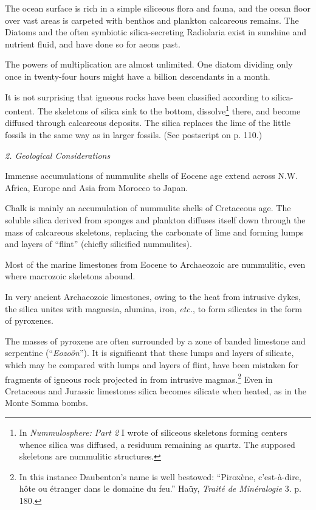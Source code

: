 \documentclass[a4paper, 12pt, oneside]{article}
\begin{document}
The ocean surface is rich in a simple siliceous flora and fauna, and the ocean floor over vast areas is carpeted with benthos and plankton calcareous remains. The Diatoms and the often symbiotic silica-secreting Radiolaria exist in sunshine and nutrient fluid, and have done so for aeons past.

The powers of multiplication are almost unlimited. One diatom dividing only once in twenty-four hours might have a billion descendants in a month.

It is not surprising that igneous rocks have been classified according to silica-content. The skeletons of silica sink to the bottom, dissolve\footnote{In \emph{Nummulosphere: Part 2} I wrote of siliceous skeletons forming centers whence silica was diffused, a residuum remaining as quartz. The supposed skeletons are nummulitic structures.} there, and become diffused through calcareous deposits. The silica replaces the lime of the little fossils in the same way as in larger fossils. (See postscript on p. 110.)

\bigskip
\centerline{\emph{2. Geological Considerations}}

Immense accumulations of nummulite shells of Eocene age extend across N.W. Africa, Europe and Asia from Morocco to Japan.

Chalk is mainly an accumulation of nummulite shells of Cretaceous age. The soluble silica derived from sponges and plankton diffuses itself down through the mass of calcareous skeletons, replacing the carbonate of lime and forming lumps and layers of ``flint'' (chiefly silicified nummulites).

Most of the marine limestones from Eocene to Archaeozoic are nummulitic, even where macrozoic skeletons abound.

In very ancient Archaeozoic limestones, owing to the heat from intrusive dykes, the silica unites with magnesia, alumina, iron, \emph{etc.}, to form silicates in the form of pyroxenes.

The masses of pyroxene are often surrounded by a zone of banded limestone and serpentine (``\emph{Eozoön}''). It is significant that these lumps and layers of silicate, which may be compared with lumps and layers of flint, have been mistaken for fragments of igneous rock projected in from intrusive magmas.\footnote{In this instance Daubenton's name is well bestowed: ``Piroxène, c'est-à-dire, hôte ou étranger dans le domaine du feu.'' Haüy, \emph{Traité de Minéralogie} 3. p. 180.} Even in Cretaceous and Jurassic limestones silica becomes silicate when heated, as in the Monte Somma bombs.
\end{document}
